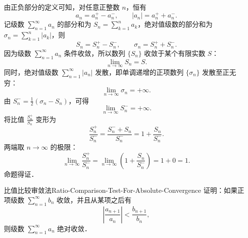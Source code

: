 \begin{myproof}
    由正负部分的定义可知，对任意正整数 $n$，恒有
    \begin{equation}
        a_n = a_n^+ - a_n^-, \qquad |a_n| = a_n^+ + a_n^-.
    \end{equation}
    记级数 $\sum_{n=1}^\infty a_n$ 的部分和为 $S_n = \sum_{k=1}^n a_k$，绝对值级数的部分和为 $\sigma_n = \sum_{k=1}^n |a_k|$，则
    \begin{equation}
        S_n = S_n^+ - S_n^-, \qquad \sigma_n = S_n^+ + S_n^-.
    \end{equation}
    因为级数 $\sum_{n=1}^\infty a_n$ 条件收敛，所以数列 $\{S_n\}$ 收敛于某个有限实数 $S$：
    \begin{equation}
        \lim_{n\to\infty} S_n = S.
    \end{equation}
    同时，绝对值级数 $\sum_{n=1}^\infty |a_n|$ 发散，即单调递增的正项数列 $\{\sigma_n\}$ 发散至正无穷：
    \begin{equation}
        \lim_{n\to\infty} \sigma_n = +\infty.
    \end{equation}
    由 $S_n^- = \frac{1}{2}(\sigma_n - S_n)$，可得
    \begin{equation}
        \lim_{n\to\infty} S_n^- = +\infty.
    \end{equation}
    将比值 $\frac{S_n^+}{S_n^-}$ 变形为
    \begin{equation}
        \frac{S_n^+}{S_n^-} = \frac{S_n^- + S_n}{S_n^-} = 1 + \frac{S_n}{S_n^-}.
    \end{equation}
    两端取 $n \to \infty$ 的极限：
    \begin{equation}
        \lim_{n\to\infty} \frac{S_n^+}{S_n^-} = \lim_{n\to\infty} \left( 1 + \frac{S_n}{S_n^-} \right) = 1 + 0 = 1.
    \end{equation}
    命题得证．
\end{myproof}

\begin{problem}{比值比较审敛法}{Ratio-Comparison-Test-For-Absolute-Convergence}
    证明：如果正项级数 $\sum_{n=1}^\infty b_n$ 收敛，并且从某项之后有
    \begin{equation}
        \left|\frac{a_{n+1}}{a_n}\right| < \frac{b_{n+1}}{b_n},
    \end{equation}
    则级数 $\sum_{n=1}^\infty a_n$ 绝对收敛．
\end{problem}

